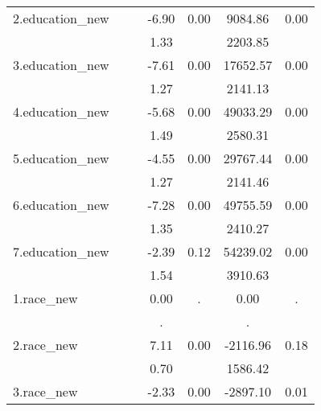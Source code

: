 {\begin{tabular}{l*{3}{cc}}
2.education\_new&                     &            &       -6.90\sym{***}&        0.00&     9084.86\sym{***}&        0.00\\
            &                     &            &        1.33         &            &     2203.85         &            \\
3.education\_new&                     &            &       -7.61\sym{***}&        0.00&    17652.57\sym{***}&        0.00\\
            &                     &            &        1.27         &            &     2141.13         &            \\
4.education\_new&                     &            &       -5.68\sym{***}&        0.00&    49033.29\sym{***}&        0.00\\
            &                     &            &        1.49         &            &     2580.31         &            \\
5.education\_new&                     &            &       -4.55\sym{***}&        0.00&    29767.44\sym{***}&        0.00\\
            &                     &            &        1.27         &            &     2141.46         &            \\
6.education\_new&                     &            &       -7.28\sym{***}&        0.00&    49755.59\sym{***}&        0.00\\
            &                     &            &        1.35         &            &     2410.27         &            \\
7.education\_new&                     &            &       -2.39         &        0.12&    54239.02\sym{***}&        0.00\\
            &                     &            &        1.54         &            &     3910.63         &            \\
1.race\_new  &                     &            &        0.00         &           .&        0.00         &           .\\
            &                     &            &           .         &            &           .         &            \\
2.race\_new  &                     &            &        7.11\sym{***}&        0.00&    -2116.96         &        0.18\\
            &                     &            &        0.70         &            &     1586.42         &            \\
3.race\_new  &                     &            &       -2.33\sym{***}&        0.00&    -2897.10\sym{*}  &        0.01\\

\end{tabular}}
